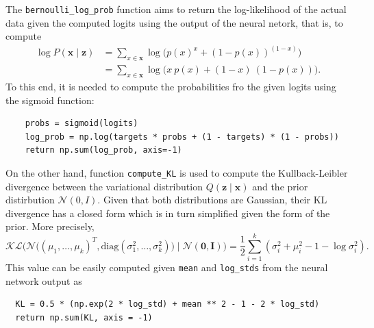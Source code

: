 \documentclass[11pt]{article}
\begin{document}
 The \texttt{bernoulli\_log\_prob} function aims to return the log-likelihood of the actual data given the computed logits using the output of the neural netork, that is, to compute
 \[
   \begin{aligned}
     \log P(\bm{x} \mid \bm{z}) &= \sum_{x \in \bm{x}}\log\Big(p(x)^{x} + (1-p(x))^{(1-x)}\Big)\\
      &= \sum_{x \in \bm{x}}\log\Big( x\ p(x) + (1-x)\ (1-p(x))\Big).
     \end{aligned}
  \]
  To this end, it is needed to compute the probabilities fro the given logits using the sigmoid function:
  \begin{verbatim}
    probs = sigmoid(logits)
    log_prob = np.log(targets * probs + (1 - targets) * (1 - probs))
    return np.sum(log_prob, axis=-1)
  \end{verbatim}
  On the other hand, function \texttt{compute\_KL} is used to compute the Kullback-Leibler divergence between the variational distribution \( Q(\bm{z} \mid \bm{x}) \)  and the prior distirbution \( \mathcal{N}(0, I)\). Given that both distributions are Gaussian, their KL divergence has a closed form which is in turn simplified given the form of the prior. More precisely,
  \[
    \mathcal{KL}\Big( \mathcal{N}\big((\mu_{1}, \dots, \mu_{k})^{T}, \text{diag}(\sigma^{2}_{1}, \dots, \sigma^{2}_{k}) \big) \mid \mathcal{N}(\bm{0}, \bm{I}) \Big) = \frac{1}{2}\sum_{i=1}^{k}\left( \sigma_{i}^{2} + \mu_{i}^{2} - 1 - \log\sigma_{i}^{2} \right).
  \]
  This value can be easily computed given \texttt{mean} and \texttt{log\_stds} from the neural network output as

\begin{verbatim}
  KL = 0.5 * (np.exp(2 * log_std) + mean ** 2 - 1 - 2 * log_std)
  return np.sum(KL, axis = -1)
\end{verbatim}
\end{document}
